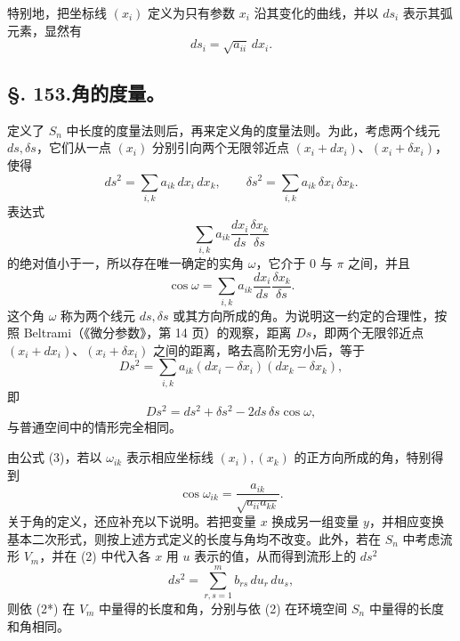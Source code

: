 特别地，把坐标线 \((x_i)\) 定义为只有参数 \(x_i\) 沿其变化的曲线，并以 \(ds_i\) 表示其弧元素，显然有
\[
 ds_i=\sqrt{a_{ii}}\,dx_i.
\]

\subsection*{\S. 153.\quad 角的度量。}

定义了 \(S_n\) 中长度的度量法则后，再来定义角的度量法则。为此，考虑两个线元 \(ds,\delta s\)，它们从一点 \((x_i)\) 分别引向两个无限邻近点 \((x_i+dx_i)\)、\((x_i+\delta x_i)\)，使得
\[
 ds^2=\sum_{i,k}a_{ik}\,dx_i\,dx_k,
 \qquad
 \delta s^2=\sum_{i,k}a_{ik}\,\delta x_i\,\delta x_k.
\]
表达式
\[
 \sum_{i,k}a_{ik}\frac{dx_i}{ds}\frac{\delta x_k}{\delta s}
\]
的绝对值小于一，所以存在唯一确定的实角 \(\omega\)，它介于 \(0\) 与 \(\pi\) 之间，并且
\begin{equation}\tag{3}
 \cos\omega=\sum_{i,k}a_{ik}\frac{dx_i}{ds}\frac{\delta x_k}{\delta s}.
\end{equation}
这个角 \(\omega\) 称为两个线元 \(ds,\delta s\) 或其方向所成的角。为说明这一约定的合理性，按照 Beltrami（《微分参数》，第 14 页）的观察，距离 \(Ds\)，即两个无限邻近点 \((x_i+dx_i)\)、\((x_i+\delta x_i)\) 之间的距离，略去高阶无穷小后，等于
\[
 Ds^2=\sum_{i,k}a_{ik}(dx_i-\delta x_i)(dx_k-\delta x_k),
\]
即
\[
 Ds^2=ds^2+\delta s^2-2ds\,\delta s\cos\omega,
\]
与普通空间中的情形完全相同。

由公式 (3)，若以 \(\omega_{ik}\) 表示相应坐标线 \((x_i),(x_k)\) 的正方向所成的角，特别得到
\begin{equation}\tag{3*}
 \cos\omega_{ik}=\frac{a_{ik}}{\sqrt{a_{ii}a_{kk}}}.
\end{equation}
关于角的定义，还应补充以下说明。若把变量 \(x\) 换成另一组变量 \(y\)，并相应变换基本二次形式，则按上述方式定义的长度与角均不改变。此外，若在 \(S_n\) 中考虑流形 \(V_m\)，并在 (2) 中代入各 \(x\) 用 \(u\) 表示的值，从而得到流形上的 \(ds^2\)
\begin{equation}\tag{2*}
 ds^2=\sum_{r,s=1}^{m}b_{rs}\,du_r\,du_s,
\end{equation}
则依 (2*) 在 \(V_m\) 中量得的长度和角，分别与依 (2) 在环境空间 \(S_n\) 中量得的长度和角相同。


